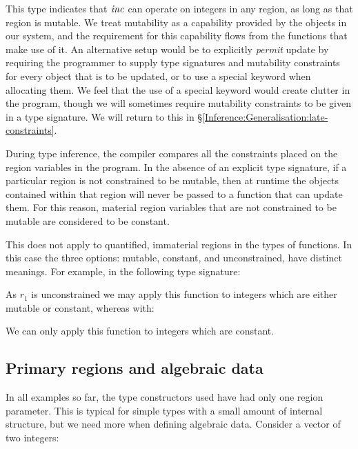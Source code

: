 
This type indicates that $\operatorname{\mathit{inc}}$ can operate on integers in any region, as long as that region is mutable. We treat mutability as a capability provided by the objects in our system, and the requirement for this capability flows from the functions that make use of it. An alternative setup would be to explicitly \emph{permit} update by requiring the programmer to supply type signatures and mutability constraints for every object that is to be updated, or to use a special keyword when allocating them. We feel that the use of a special keyword would create clutter in the program, though we will sometimes require mutability constraints to be given in a type signature. We will return to this in \S\ref{Inference:Generalisation:late-constraints}.

During type inference, the compiler compares all the constraints placed on the region variables in the program. In the absence of an explicit type signature, if a particular region is not constrained to be mutable, then at runtime the objects contained within that region will never be passed to a function that can update them. For this reason, material region variables that are not constrained to be mutable are considered to be constant.

This does not apply to quantified, immaterial regions in the types of functions. In this case the three options: mutable, constant, and unconstrained, have distinct meanings. For example, in the following type signature:


As $r_1$ is unconstrained we may apply this function to integers which are either mutable or constant, whereas with:


We can only apply this function to integers which are constant.


\subsection{Primary regions and algebraic data}
In all examples so far, the type constructors used have had only one region parameter. This is typical for simple types with a small amount of internal structure, but we need more when defining algebraic data. Consider a vector of two integers:

